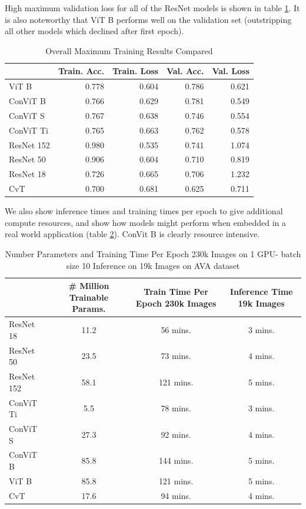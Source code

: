 High maximum validation loss for all of the ResNet models is shown in table \ref{tab:summary of training}. It is also noteworthy that ViT B performs well on the validation set (outstripping all other models which declined after first epoch).  
\begin{table}[ht!]
\small
    \centering
    \begin{tabular}{lrrrr}
\toprule
{} &  Train. Acc. &  Train. Loss &  Val. Acc. &  Val. Loss \\
\midrule
ViT B      &      0.778 &       0.604 &    0.786 &     0.621 \\
ConViT B   &      0.766 &       0.629 &    0.781 &     0.549 \\
ConViT S   &      0.767 &       0.638 &    0.746 &     0.554 \\
ConViT Ti  &      0.765 &       0.663 &    0.762 &     0.578 \\
ResNet 152 &      0.980 &       0.535 &    0.741 &     1.074 \\
ResNet 50  &      0.906 &       0.604 &    0.710 &     0.819 \\
ResNet 18  &      0.726 &       0.665 &    0.706 &     1.232 \\
CvT        &      0.700 &       0.681 &    0.625 &     0.711 \\

\bottomrule
\end{tabular}
\caption{Overall Maximum Training Results Compared}
    \label{tab:summary of training}
\end{table}

\newpage

We also show inference times and training times per epoch to give additional compute resources, and show how models might perform when embedded in a real world application (table \ref{tab:compute time}). ConVit B is clearly resource intensive. 



\begin{table}[ht!]
    \centering
    \tiny 
   \begin{tabular}{lccc}
\toprule
{} &  \# Million Trainable Params. & Train Time Per Epoch 230k Images & Inference Time 19k Images\\
\midrule
ResNet 18  &        11.2 & 56 mins.  & 3 mins.\\
ResNet 50  &        23.5 & 73 mins.  & 4 mins.\\
ResNet 152 &        58.1 & 121 mins. & 5 mins.\\
ConViT Ti  &         5.5 & 78 mins.  & 3 mins.\\
ConViT S   &        27.3 & 92 mins.  & 4 mins.\\
ConViT B   &        85.8 & 144 mins. & 5 mins.\\
ViT B      &        85.8 & 121 mins. & 5 mins.\\
CvT        &        17.6 & 94 mins.  & 4 mins.\\
\bottomrule
\end{tabular}
    \caption{Number Parameters and Training Time Per Epoch 230k Images on 1 GPU- batch size 10 Inference on 19k Images on AVA dataset}
    \label{tab:compute time}
\end{table}

